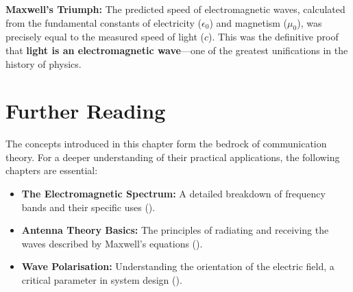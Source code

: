 \begin{keyconcept}
    \textbf{Maxwell's Triumph:} The predicted speed of electromagnetic waves, calculated from the fundamental constants of electricity ($\epsilon_0$) and magnetism ($\mu_0$), was precisely equal to the measured speed of light ($c$). This was the definitive proof that \textbf{light is an electromagnetic wave}---one of the greatest unifications in the history of physics.
\end{keyconcept}


\section{Further Reading}

\begin{importantbox}[title={Further Reading}]
    The concepts introduced in this chapter form the bedrock of communication theory. For a deeper understanding of their practical applications, the following chapters are essential:
    \begin{itemize}
        \item \textbf{The Electromagnetic Spectrum:} A detailed breakdown of frequency bands and their specific uses ().
        \item \textbf{Antenna Theory Basics:} The principles of radiating and receiving the waves described by Maxwell's equations ().
        \item \textbf{Wave Polarisation:} Understanding the orientation of the electric field, a critical parameter in system design ().
    \end{itemize}
\end{importantbox}